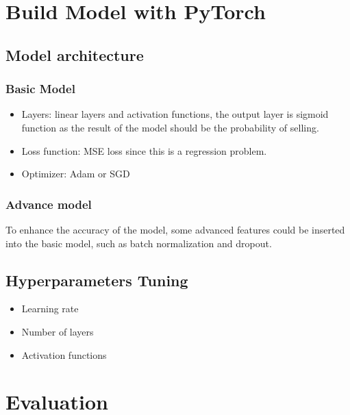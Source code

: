 \documentclass[12pt,twoside]{report}
\begin{document}
\section{Build Model with PyTorch}
\subsection{Model architecture}
\subsubsection{Basic Model}
\begin{itemize}
	\item Layers: linear layers and activation functions, the output layer is sigmoid function as the result of the model should be the probability of selling.
	\item Loss function: MSE loss since this is a regression problem.
	\item Optimizer: Adam or SGD
\end{itemize}
\subsubsection{Advance model}
To enhance the accuracy of the model, some advanced features could be inserted into the basic model, such as batch normalization and dropout. 

\subsection{Hyperparameters Tuning}
\begin{itemize}
	\item Learning rate
	\item Number of layers
	\item Activation functions
\end{itemize}

\section{Evaluation}








\end{document}
